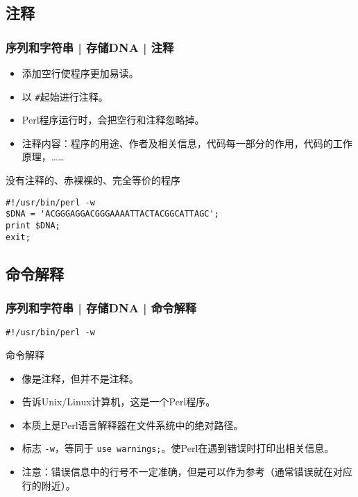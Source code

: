 \subsection{注释}
\begin{frame}[fragile]
  \frametitle{序列和字符串 | 存储DNA | 注释}
  \begin{itemize}
    \item 添加空行使程序更加易读。
    \item 以 \verb|#|起始进行注释。
    \item Perl程序运行时，会把空行和注释忽略掉。
    \item 注释内容：程序的用途、作者及相关信息，代码每一部分的作用，代码的工作原理，……
  \end{itemize}
  \pause
  \begin{block}{没有注释的、赤裸裸的、完全等价的程序}
\begin{lstlisting}
#!/usr/bin/perl -w
$DNA = 'ACGGGAGGACGGGAAAATTACTACGGCATTAGC';
print $DNA;
exit;
\end{lstlisting}
  \end{block}
\end{frame}

\subsection{命令解释}
\begin{frame}[fragile]
  \frametitle{序列和字符串 | 存储DNA | \alert{命令解释}}
\begin{lstlisting}
#!/usr/bin/perl -w
\end{lstlisting}
\pause
\begin{block}{命令解释}
  \begin{itemize}
    \item 像是注释，但并不是注释。
    \item 告诉Unix/Linux计算机，这是一个Perl程序。
    \item 本质上是Perl语言解释器在文件系统中的绝对路径。
    \item 标志 \verb|-w|，等同于 \verb|use warnings;|。使Perl在遇到错误时打印出相关信息。
    \item 注意：错误信息中的行号不一定准确，但是可以作为参考（通常错误就在对应行的附近）。
  \end{itemize}
\end{block}
\end{frame}

